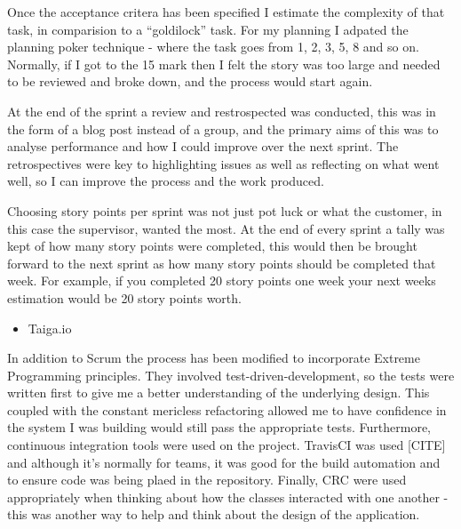 Once the acceptance critera has been specified I estimate the complexity of that task, in comparision to a ``goldilock'' task.  For my planning I adpated the planning poker technique - where the task goes from 1, 2, 3, 5, 8 and so on. Normally, if I got to the 15 mark then I felt the story was too large and needed to be reviewed and broke down, and the process would start again.

At the end of the sprint a review and restrospected was conducted, this was in the form of a blog post instead of a group, and the primary aims of this was to analyse performance and how I could improve over the next sprint. The retrospectives were key to highlighting issues as well as reflecting on what went well, so I can improve the process and the work produced.

Choosing story points per sprint was not just pot luck or what the customer, in this case the supervisor, wanted the most. At the end of every sprint a tally was kept of how many story points were completed, this would then be brought forward to the next sprint as how many story points should be completed that week. For example, if you completed 20 story points one week your next weeks estimation would be 20 story points worth.


\begin{itemize}
  \item Taiga.io
\end{itemize}
In addition to Scrum the process has been modified to incorporate Extreme Programming principles. They involved test-driven-development, so the tests were written first to give me a better understanding of the underlying design. This coupled with the constant mericless refactoring allowed me to have confidence in the system I was building would still pass the appropriate tests. Furthermore, continuous integration tools were used on the project. TravisCI was used [CITE] and although it's normally for teams, it was good for the build automation and to ensure code was being plaed in the repository. Finally, CRC were used appropriately when thinking about how the classes interacted with one another - this was another way to help and think about the design of the application.

